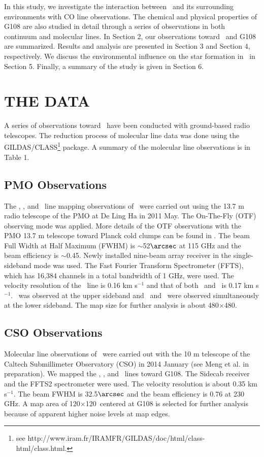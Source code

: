 \documentclass[manuscript]{aastex}
\begin{document}
In this study, we investigate the interaction between \sou\ and its surrounding environments with CO line observations.
The chemical and physical properties of G108 are also studied in detail through a series of observations in both continuum and molecular lines.
In Section 2, our observations toward \sou\ and G108 are summarized.
Results and analysis are presented in Section 3 and Section 4, respectively.
We discuss the environmental influence on the star formation in \sou\ in Section 5.
Finally, a summary of the study is given in Section 6.


\section{THE DATA}

A series of observations toward \sou\ have been conducted with ground-based radio telescopes.
The reduction process of molecular line data was done using the GILDAS/CLASS\footnote{see http://www.iram.fr/IRAMFR/GILDAS/doc/html/class-html/class.html.} package.
A summary of the molecular line observations is in Table 1.

\subsection{PMO Observations}
The \tco, \thco, and \ceo\ line mapping observations of \sou\ were carried out using the 13.7 m radio telescope of the PMO at De Ling Ha in 2011 May.
The On-The-Fly (OTF) observing mode was applied.
More details of the OTF observations with the PMO 13.7 m telescope toward Planck cold clumps can be found in \citet{liu12}.
The beam Full Width at Half Maximum (FWHM) is $\sim$52$\arcsec$ at 115 GHz and the beam efficiency is $\sim$0.45.
Newly installed nine-beam array receiver in the single-sideband mode was used.
The Fast Fourier Transform Spectrometer (FFTS), which has 16,384 channels in a total bandwidth of 1 GHz, were used.
The velocity resolution of the \tco\ line is 0.16 km s$^{-1}$ and that of both \thco\ and \ceo\ is 0.17 km s$^{-1}$.
\tco\ was observed at the upper sideband and \thco\ and \ceo\ were observed simultaneously at the lower sideband.
The map size for further analysis is about 480\arcsec$\times$480\arcsec.

\subsection{CSO Observations}

Molecular line observations of \sou\ were carried out with the 10 m telescope of the Caltech Submillimeter Observatory (CSO) in 2014 January (see Meng et al. in preparation).
We mapped the \tcot, \thcot, and \ceot\ lines toward G108.
The Sidecab receiver and the FFTS2 spectrometer were used.
The velocity resolution is about 0.35 km s$^{-1}$.
The beam FWHM is 32.5$\arcsec$ and the beam efficiency is 0.76 at 230 GHz.
A map area of 120\arcsec$\times$120\arcsec\ centered at G108 is selected for further analysis because of apparent higher noise levels at map edges.
\end{document}

